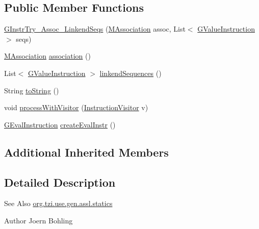 \subsection*{Public Member Functions}
\begin{DoxyCompactItemize}
\item 
\hyperlink{classorg_1_1tzi_1_1use_1_1gen_1_1assl_1_1statics_1_1_g_instr_try___assoc___linkend_seqs_aca81885e52356c953fcccd7ec16b0895}{G\-Instr\-Try\-\_\-\-Assoc\-\_\-\-Linkend\-Seqs} (\hyperlink{interfaceorg_1_1tzi_1_1use_1_1uml_1_1mm_1_1_m_association}{M\-Association} assoc, List$<$ \hyperlink{interfaceorg_1_1tzi_1_1use_1_1gen_1_1assl_1_1statics_1_1_g_value_instruction}{G\-Value\-Instruction} $>$ seqs)
\item 
\hyperlink{interfaceorg_1_1tzi_1_1use_1_1uml_1_1mm_1_1_m_association}{M\-Association} \hyperlink{classorg_1_1tzi_1_1use_1_1gen_1_1assl_1_1statics_1_1_g_instr_try___assoc___linkend_seqs_aa6fddc1a37ab51f2102ccf25f7605355}{association} ()
\item 
List$<$ \hyperlink{interfaceorg_1_1tzi_1_1use_1_1gen_1_1assl_1_1statics_1_1_g_value_instruction}{G\-Value\-Instruction} $>$ \hyperlink{classorg_1_1tzi_1_1use_1_1gen_1_1assl_1_1statics_1_1_g_instr_try___assoc___linkend_seqs_ac9a3d8230ba83bfb0d7f816a98721fb3}{linkend\-Sequences} ()
\item 
String \hyperlink{classorg_1_1tzi_1_1use_1_1gen_1_1assl_1_1statics_1_1_g_instr_try___assoc___linkend_seqs_a9edbd7924114e449e6c2094db3e9f9ec}{to\-String} ()
\item 
void \hyperlink{classorg_1_1tzi_1_1use_1_1gen_1_1assl_1_1statics_1_1_g_instr_try___assoc___linkend_seqs_a33d8d3f9a41da198995bdd4605115744}{process\-With\-Visitor} (\hyperlink{interfaceorg_1_1tzi_1_1use_1_1gen_1_1assl_1_1statics_1_1_instruction_visitor}{Instruction\-Visitor} v)
\item 
\hyperlink{classorg_1_1tzi_1_1use_1_1gen_1_1assl_1_1dynamics_1_1_g_eval_instruction}{G\-Eval\-Instruction} \hyperlink{classorg_1_1tzi_1_1use_1_1gen_1_1assl_1_1statics_1_1_g_instr_try___assoc___linkend_seqs_aeb80d2971531b1a6aad30ea5e364bc48}{create\-Eval\-Instr} ()
\end{DoxyCompactItemize}
\subsection*{Additional Inherited Members}


\subsection{Detailed Description}
\begin{DoxySeeAlso}{See Also}
\hyperlink{namespaceorg_1_1tzi_1_1use_1_1gen_1_1assl_1_1statics}{org.\-tzi.\-use.\-gen.\-assl.\-statics} 
\end{DoxySeeAlso}
\begin{DoxyAuthor}{Author}
Joern Bohling 
\end{DoxyAuthor}


